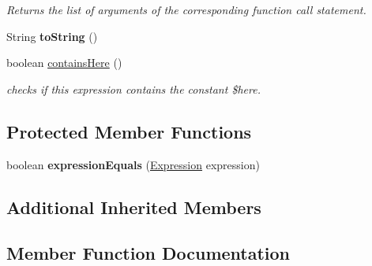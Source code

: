 \begin{DoxyCompactItemize}
\begin{DoxyCompactList}\small\item\em Returns the list of arguments of the corresponding function call statement. \end{DoxyCompactList}\item 
\hypertarget{classedu_1_1udel_1_1cis_1_1vsl_1_1civl_1_1model_1_1common_1_1expression_1_1CommonFunctionGuardExpression_a2035debfa44f3f74447b9bf4fa1f7af7}{}String {\bfseries to\+String} ()\label{classedu_1_1udel_1_1cis_1_1vsl_1_1civl_1_1model_1_1common_1_1expression_1_1CommonFunctionGuardExpression_a2035debfa44f3f74447b9bf4fa1f7af7}

\item 
boolean \hyperlink{classedu_1_1udel_1_1cis_1_1vsl_1_1civl_1_1model_1_1common_1_1expression_1_1CommonFunctionGuardExpression_ad1ce2462b61c4cd74dcfd10d398979b0}{contains\+Here} ()
\begin{DoxyCompactList}\small\item\em checks if this expression contains the constant \$here. \end{DoxyCompactList}\end{DoxyCompactItemize}
\subsection*{Protected Member Functions}
\begin{DoxyCompactItemize}
\item 
\hypertarget{classedu_1_1udel_1_1cis_1_1vsl_1_1civl_1_1model_1_1common_1_1expression_1_1CommonFunctionGuardExpression_aab1e4acd5e0a3c3a699e262f7869b003}{}boolean {\bfseries expression\+Equals} (\hyperlink{interfaceedu_1_1udel_1_1cis_1_1vsl_1_1civl_1_1model_1_1IF_1_1expression_1_1Expression}{Expression} expression)\label{classedu_1_1udel_1_1cis_1_1vsl_1_1civl_1_1model_1_1common_1_1expression_1_1CommonFunctionGuardExpression_aab1e4acd5e0a3c3a699e262f7869b003}

\end{DoxyCompactItemize}
\subsection*{Additional Inherited Members}


\subsection{Member Function Documentation}
\hypertarget{classedu_1_1udel_1_1cis_1_1vsl_1_1civl_1_1model_1_1common_1_1expression_1_1CommonFunctionGuardExpression_aa8a210bb5db1a61ef54f7ad10b5707d9}{}
